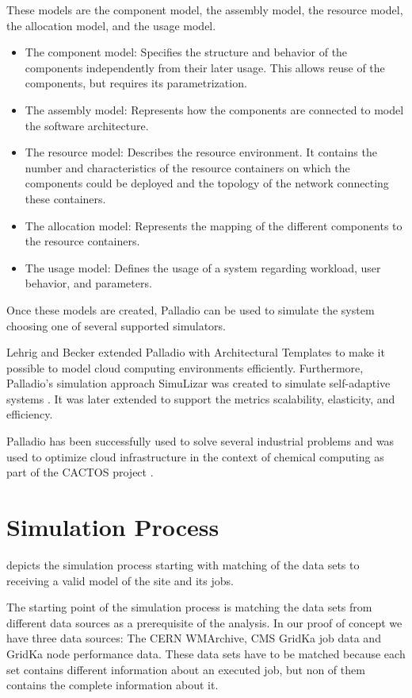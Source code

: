 \documentclass[a4paper]{jpconf}
\begin{document}
These models are the component model, the assembly model, the resource model, the allocation model, and the usage model.
\begin{itemize}
	\item The component model: Specifies the structure and behavior of the components independently from their later usage. This allows reuse of the components, but requires its parametrization.
	\item The assembly model: Represents how the components are connected to model the software architecture.
	\item The resource model: Describes the resource environment. It contains the number and characteristics of the resource containers on which the components could be deployed and the topology of the network connecting these containers.
	\item The allocation model: Represents the mapping of the different components to the resource containers.
	\item The usage model: Defines the usage of a system regarding workload, user behavior, and parameters.
	
\end{itemize}
Once these models are created, Palladio can be used to simulate the system choosing one of several supported simulators. 

Lehrig and Becker \cite{arch} extended Palladio with Architectural Templates to make it possible to model cloud computing environments efficiently.
Furthermore, Palladio's simulation approach SimuLizar was created to simulate self-adaptive systems \cite{becker2013simulizar}.
It was later extended to support the metrics scalability, elasticity, and efficiency.

Palladio has been successfully used to solve several industrial problems and was used to optimize cloud infrastructure in the context of chemical computing as part of the CACTOS project \cite{rapidtesting}. 

\section{Simulation Process}
\label{sec:process}

 depicts the simulation process starting with matching of the data sets to receiving a valid model of the site and its jobs.

The starting point of the simulation process is matching the data sets from different data sources as a prerequisite  of the analysis. In our proof of concept we have three data sources: The CERN WMArchive, CMS GridKa job data and GridKa node performance data. These data sets have to be matched because each set contains different information about an executed job, but non of them contains the complete information about it.
\end{document}
